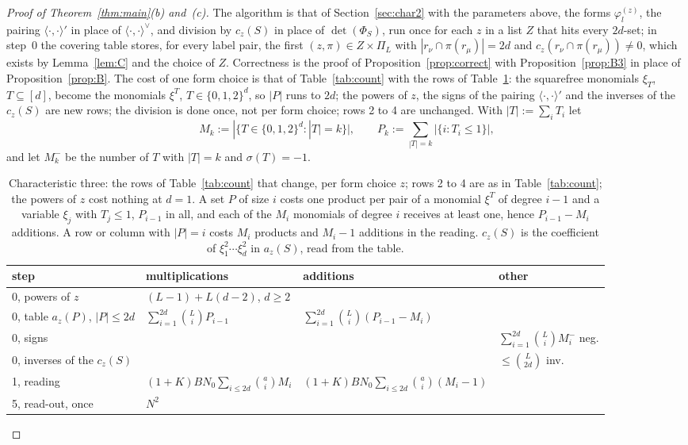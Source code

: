 \documentclass[11pt]{article}
\theoremstyle{definition}
\theoremstyle{remark}
\newcommand{\Nz}{N_0}
\newcommand{\pairR}[2]{\langle #1,#2\rangle^{\vee}}
\newcommand{\pairRt}[2]{\langle #1,#2\rangle'}
\begin{document}
\begin{proof}[Proof of Theorem~\ref{thm:main}(b) and~(c)]
The algorithm is that of Section~\ref{sec:char2} with the parameters above, the forms $\varphi^{(z)}_l$, the pairing $\pairRt\cdot\cdot$ in place of $\pairR\cdot\cdot$, and division by $c_z(S)$ in place of $\det(\Phi_S)$, run once for each $z$ in a list $Z$ that hits every $2d$-set; in step~0 the covering table stores, for every label pair, the first $(z,\pi)\in Z\times\Pi_L$ with $|r_\nu\cap\pi(r_\mu)|=2d$ and $c_z(r_\nu\cap\pi(r_\mu))\ne0$, which exists by Lemma~\ref{lem:C} and the choice of $Z$. Correctness is the proof of Proposition~\ref{prop:correct} with Proposition~\ref{prop:B3} in place of Proposition~\ref{prop:B}. The cost of one form choice is that of Table~\ref{tab:count} with the rows of Table~\ref{tab:count3}: the squarefree monomials $\xi_T$, $T\subseteq[d]$, become the monomials $\xi^T$, $T\in\{0,1,2\}^d$, so $|P|$ runs to $2d$; the powers of $z$, the signs of the pairing $\pairRt\cdot\cdot$ and the inverses of the $c_z(S)$ are new rows; the division is done once, not per form choice; rows 2 to 4 are unchanged. With $|T|:=\sum_iT_i$ let
\[
M_k:=|\{T\in\{0,1,2\}^d:|T|=k\}|,\qquad P_k:=\sum_{|T|=k}|\{i:T_i\le1\}|,
\]
and let $M^-_k$ be the number of $T$ with $|T|=k$ and $\sigma(T)=-1$.

\begin{table}[ht]
\centering\footnotesize
\renewcommand{\arraystretch}{1.25}
\begin{tabular}{@{}llll@{}}
\toprule
step & multiplications & additions & other\\
\midrule
0, powers of $z$ & $(L-1)+L(d-2)$, $d\ge2$ & & \\
0, table $a_z(P)$, $|P|\le2d$ & $\sum_{i=1}^{2d}\binom LiP_{i-1}$ & $\sum_{i=1}^{2d}\binom Li(P_{i-1}-M_i)$ & \\
0, signs & & & $\sum_{i=1}^{2d}\binom LiM^-_i$ neg.\\
0, inverses of the $c_z(S)$ & & & $\le\binom L{2d}$ inv.\\
1, reading & $(1+K)B\Nz\sum_{i\le2d}\binom aiM_i$ & $(1+K)B\Nz\sum_{i\le2d}\binom ai(M_i-1)$ & \\
5, read-out, once & $N^2$ & & \\
\bottomrule
\end{tabular}
\caption{Characteristic three: the rows of Table~\ref{tab:count} that change, per form choice $z$; rows 2 to 4 are as in Table~\ref{tab:count}; the powers of $z$ cost nothing at $d=1$. A set $P$ of size $i$ costs one product per pair of a monomial $\xi^T$ of degree $i-1$ and a variable $\xi_j$ with $T_j\le1$, $P_{i-1}$ in all, and each of the $M_i$ monomials of degree $i$ receives at least one, hence $P_{i-1}-M_i$ additions. A row or column with $|P|=i$ costs $M_i$ products and $M_i-1$ additions in the reading. $c_z(S)$ is the coefficient of $\xi_1^2\cdots\xi_d^2$ in $a_z(S)$, read from the table.}\label{tab:count3}
\end{table}


\end{proof}
\end{document}
